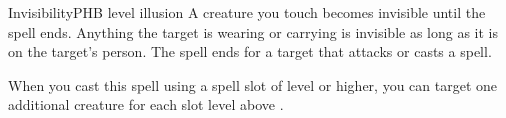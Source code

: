 \begin{spell}{Invisibility}{PHB}{ level illusion}
{
}
A creature you touch becomes invisible until the spell
ends. Anything the target is wearing or carrying is
invisible as long as it is on the target's person. The spell
ends for a target that attacks or casts a spell.

 When you cast this spell using
a spell slot of  level or higher, you can target one
additional creature for each slot level above .
\end{spell}